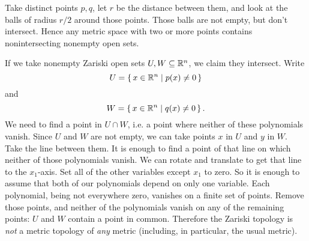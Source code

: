 \begin{example}
Take distinct points \(p, q\), let \(r\) be the distance between them, and look at the balls of radius \(r/2\) around those points.
Those balls are not empty, but don't intersect.
Hence any metric space with two or more points contains nonintersecting nonempty open sets.
\end{example}
\begin{example}
If we take nonempty Zariski open sets \(U,W \subseteq \mathbb{R}^{n}\), we claim they intersect.
Write
\[
U=\set{x \in \ensuremath{\mathbb{R}^{n}}|p(x) \ne 0}
\]
and
\[
W=
\set{x \in \ensuremath{\mathbb{R}^{n}}|q(x) \ne 0}.
\]
We need to find a point in \(U\cap W\), i.e. a point where neither of these polynomials vanish.
Since \(U\) and \(W\) are not empty, we can take points \(x\) in \(U\) and \(y\) in \(W\).
Take the line between them.
It is enough to find a point of that line on which neither of those polynomials vanish.
We can rotate and translate to get that line to the \(x_1\)-axis.
Set all of the other variables except \(x_1\) to zero.
So it is enough to assume that both of our polynomials depend on only one variable.
Each polynomial, being not everywhere zero, vanishes on a finite set of points.
Remove those points, and neither of the polynomials vanish on any of the remaining points: \(U\) and \(W\) contain a point in common.
Therefore the Zariski topology is \emph{not} a metric topology of \emph{any} metric (including, in particular, the usual metric).
\end{example}

